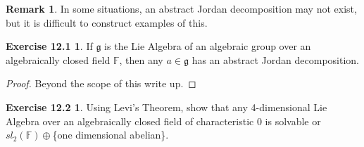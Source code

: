 \documentclass[12pt]{amsart}
\theoremstyle{definition}
\theoremstyle{definition}
\theoremstyle{definition}
\newtheorem*{rem}{Remark}
\numberwithin{equation}{subsection}
\newcommand{\g}{\mathfrak{g}}
\begin{document}
\begin{rem}
In some situations, an abstract Jordan decomposition may not exist, but it is difficult to construct examples of this.
\end{rem}

\newtheorem*{exer1}{Exercise 12.1}
\begin{exer1}
If $\g$ is the Lie Algebra of an algebraic group over an algebraically closed field $\mathbb{F}$,
then any $a \in \g$ has an abstract Jordan decomposition.
\end{exer1}
\begin{proof}
Beyond the scope of this write up.
\end{proof}

\newtheorem*{exer2}{Exercise 12.2}
\begin{exer2}
Using Levi's Theorem, show that any 4-dimensional Lie Algebra over an algebraically closed field
of characteristic 0 is solvable or $sl_2(\mathbb{F}) \oplus $\{one dimensional abelian\}.
\end{exer2}
\end{document}
